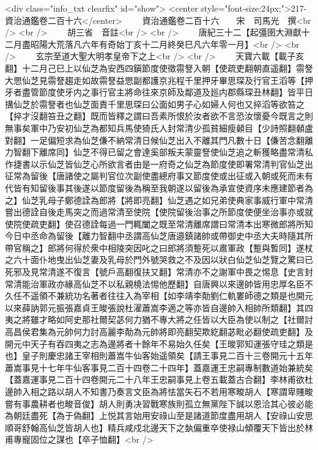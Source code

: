 <div class="info_txt clearfix" id="show">
<center style="font-size:24px;">217-資治通鑑卷二百十六</center>
  　　資治通鑑卷二百十六　　宋　司馬光　撰<br />
<br />
　　胡三省　音註<br />
<br />
　　唐紀三十二【起彊圉大淵獻十二月盡昭陽大荒落凡六年有奇始丁亥十二月終癸巳凡六年零一月】<br />
<br />
　　玄宗至道大聖大明孝皇帝下之上<br />
<br />
　　天寶六載【載子亥翻】十二月己巳上以仙芝為安西四鎭節度使徵霛詧入朝【使疏吏翻朝直遥翻】霛詧大愳仙芝見霛詧趨走如故霛詧益愳副都護京兆程千里押牙畢思琛及行官王滔等【押牙者盡管節度使牙内之事行官主將命往來京師及鄰道及廵内郡縣琛丑林翻】皆平日搆仙芝於霛詧者也仙芝面責千里思琛曰公面如男子心如婦人何也又捽滔等欲笞之【捽才沒翻笞丑之翻】既而皆釋之謂曰吾素所恨於汝者欲不言恐汝懷憂今既言之則無事矣軍中乃安初仙芝為都知兵馬使猗氏人封常清少孤貧細瘦顙目【少詩照翻顙盧對翻】一足偏短求為仙芝傔不納常清日候仙芝出入不離其門凡數十日【傔苦念翻離力智翻下離席同】仙芝不得已留之會達奚部叛夫蒙靈詧使仙芝追之斬獲略盡常清私作捷書以示仙芝皆仙芝心所欲言者由是一府奇之仙芝為節度使即署常清判官仙芝出征常為留後【唐諸使之屬判官位次副使盡總府事又節度使或出征或入朝或死而未有代皆有知留後事其後遂以節度留後為稱至我朝遂以留後為承宣使資序未應建節者為之】仙芝乳母子鄭德詮為郎將【將即亮翻】仙芝遇之如兄弟使典家事威行軍中常清嘗出德詮自後走馬突之而過常清至使院【使院留後治事之所節度使便坐治事亦或就使院使疏吏翻】使召德詮每過一門輒闔之既至常清離席謂曰常清本出寒微郎將所知今日中丞命為留後【離力智翻中丞謂高仙芝唐邉鎮諸帥或帶御史中丞大夫時隨其所帶官稱之】郎將何得於衆中相陵突因叱之曰郎將須蹔死以肅軍政【蹔與暫同】遂杖之六十面仆地曳出仙芝妻及乳母於門外號哭救之不及因以狀白仙芝仙芝覽之驚曰已死邪及見常清遂不復言【號戶高翻復扶又翻】常清亦不之謝軍中畏之惕息【史言封常清能治軍政亦緣高仙芝不以私親橈法惕他歷翻】自唐興以來邊帥皆用忠厚名臣不久任不遥領不兼統功名著者往往入為宰相【如李靖李勣劉仁軌婁師德之類是也開元以來薛訥郭元振張嘉貞王晙張說杜濯蕭嵩李適之等亦皆自邊帥入相帥所類翻】其四夷之將雖才略如阿史那社爾契苾何力猶不專大將之任皆以大臣為使以制之【社爾討高昌侯君集為元帥何力討高麗李勣為元帥將即亮翻契欺紇翻苾毗必翻使疏吏翻】及開元中天子有吞四夷之志為邊將者十餘年不易始久任矣【王晙郭知運張守珪之類是也】皇子則慶忠諸王宰相則蕭嵩牛仙客始遥領矣【請王事見二百十三卷開元十五年蕭嵩事見十七年牛仙客事見二百十四卷二十四年】蓋嘉運王忠嗣專制數道始兼統矣【蓋嘉運事見二百十四卷開元二十八年王忠嗣事見上卷五載蓋古合翻】李林甫欲杜邊帥入相之路以胡人不知書乃奏言文臣為將怯當矢石不若用寒畯胡人【寒謂卑賤畯嘗有事農耕者也畯音俊】胡人則勇决習戰寒族則孤立無黨陛下誠以恩洽其心彼必能為朝廷盡死【為于偽翻】上悦其言始用安祿山至是諸道節度盡用胡人【安祿山安思順哥舒翰高仙芝皆胡人也】精兵咸戍北邊天下之埶偏重卒使禄山傾覆天下皆出於林甫專寵固位之謀也【卒子恤翻】<br />
